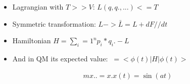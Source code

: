 \begin{itemize} %
	\item Lagrangian with $T >>  V$: $L(q,      q., ...   ) <=   T$
	\item Symmetric transformation: $L ->  \bar L = L +       dF//dt $
	\item Hamiltonian $H=\sum_i=1  ^ n p_i *          q_i. - L$
	\item And in QM its expected value: $~=             <\phi(t) | H | \phi(t)>$
\end{itemize}

\begin{align}
  m       x.. =      x.
  x(t)   = \sin(at)
\end{align}
